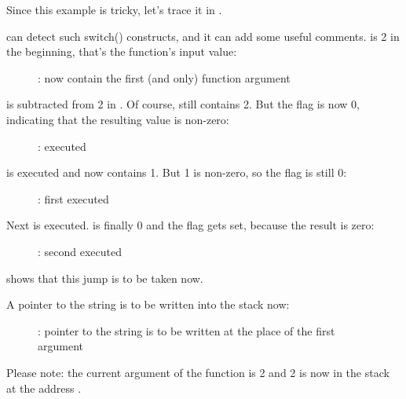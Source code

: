 ﻿\clearpage
\myparagraphold{\olly}

Since this example is tricky, let's trace it in \olly.

\olly can detect such switch() constructs, and it can add some useful comments.
\EAX is 2 in the beginning, that's the function's input value: 

\begin{figure}[H]
\centering
{}
\caption{\olly: \EAX 
now contain the first (and only) function argument}
\label{fig:switch_few_olly1}
\end{figure}

 is subtracted from 2 in \EAX. 
Of course, \EAX still contains 2.
But the \ZF flag is now 0, indicating that the resulting value is non-zero:

\begin{figure}[H]
\centering
{}
\caption{\olly: \SUB executed}
\label{fig:switch_few_olly2}
\end{figure}

\clearpage
\DEC is executed and \EAX now contains 1. 
But 1 is non-zero, so the \ZF flag is still 0:

\begin{figure}[H]
\centering
{}
\caption{\olly: first \DEC executed}
\label{fig:switch_few_olly3}
\end{figure}

\clearpage
Next \DEC is executed. 
\EAX is finally 0 and the \ZF flag gets set, because the result is zero:

\begin{figure}[H]
\centering
{}
\caption{\olly: second \DEC executed}
\label{fig:switch_few_olly4}
\end{figure}

\olly shows that this jump is to be taken now.

\clearpage
A pointer to the string  is to be written into the stack now:

\begin{figure}[H]
\centering
{}
\caption{\olly: 
pointer to the string is to be written at the place of the first argument}
\label{fig:switch_few_olly5}
\end{figure}

Please note: the current argument of the function is 2 and 2 is now in the stack at the address .

